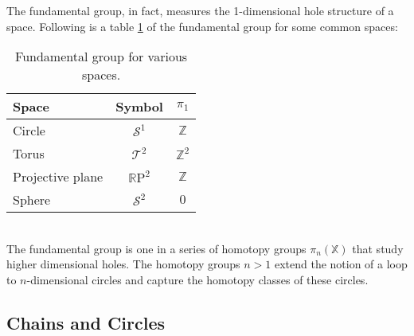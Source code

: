 The fundamental group, in fact, measures the 1-dimensional hole structure of a space.
Following is a table \ref{tab:fundamental_group} of the fundamental group for some common spaces:
\begin{table}[htpb]
\medskip
\setlength{\tabcolsep}{25pt}
\renewcommand{\arraystretch}{1.25}
   \centering
\begin{tabular}{ l | c | c } \centering
	\textbf{Space}	& \textbf{Symbol}				& \textbf{$\pi_{1}$} \\ \hline \hline
	Circle			& $\mathcal{S}^{1}$			& $\mathbb{Z}$ \\
	Torus			& $\mathcal{T}^{2}$			& $\mathbb{Z}^{2}$ \\
	Projective plane	& $\mathbb{R}\mathrm{P}^{2}$	& $\mathbb{Z}$ \\
	Sphere			& $\mathcal{S}^{2}$			& $0$ \\
\end{tabular}
	\bigskip
	\caption{Fundamental group for various spaces.}
	\label{tab:fundamental_group}
\end{table}\\
The fundamental group is one in a series of homotopy groups $\pi_{n}(\mathbb{X})$ that study higher dimensional holes.
The homotopy groups $n > 1$ extend the notion of a loop to $n$-dimensional circles and capture the homotopy
classes of these circles.

\subsection{Chains and Circles}
\label{math_chainloops}

